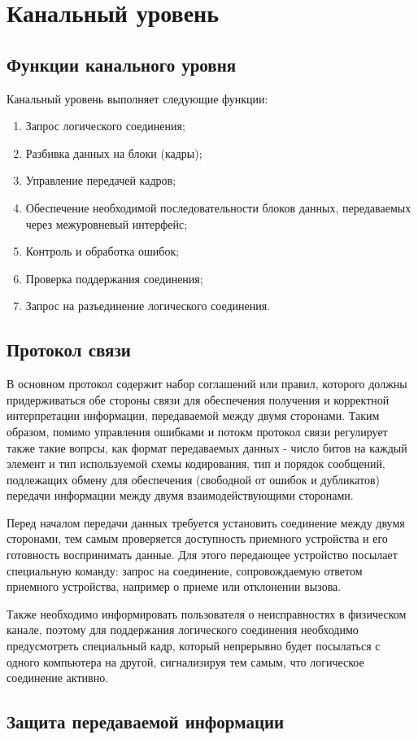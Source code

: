 \documentclass[russian,utf8,simple,emptystyle]{eskdtext}
\begin{document}
\section{Канальный уровень}
\subsection{Функции канального уровня}
Канальный уровень выполняет следующие функции:
\begin{enumerate}
\item Запрос логического соединения;
\item Разбивка данных на блоки (кадры);
\item Управление передачей кадров;
\item Обеспечение необходимой последовательности блоков данных, передаваемых через межуровневый интерфейс;
\item Контроль и обработка ошибок;
\item Проверка поддержания соединения;
\item Запрос на разъединение логического соединения.
\end{enumerate}

\subsection{Протокол связи}
В основном протокол содержит набор соглашений или правил, которого должны придерживаться обе стороны связи для обеспечения получения и корректной интерпретации информации, передаваемой между двумя сторонами. Таким образом, помимо управления ошибками и потокм протокол связи регулирует также такие вопрсы, как формат передаваемых данных - число битов на каждый элемент и тип используемой схемы кодирования, тип и порядок сообщений, подлежащих обмену для обеспечения (свободной от ошибок и дубликатов) передачи информации между двумя взаимодействующими сторонами.

Перед началом передачи данных требуется установить соединение между двумя сторонами, тем самым проверяется доступность приемного устройства и его готовность воспринимать данные. Для этого передающее устройство посылает специальную команду: запрос на соединение, сопровождаемую ответом приемного устройства, например о приеме или отклонении вызова.

Также необходимо информировать пользователя о неисправностях в физическом канале, поэтому для поддержания логического соединения необходимо предусмотреть специальный кадр, который непрерывно будет посылаться с одного компьютера на другой, сигнализируя тем самым, что логическое соединение активно.

\subsection{Защита передаваемой информации}
\end{document}
